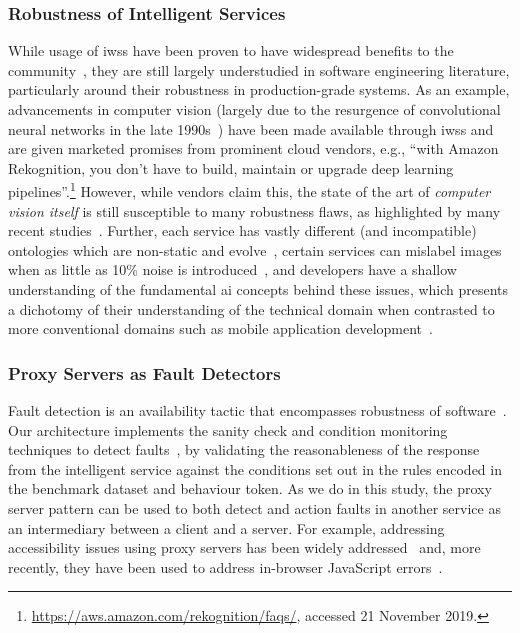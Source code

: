 \subsubsection{Robustness of Intelligent Services}
While usage of \glspl{iws} have been proven to have widespread benefits to the community~\citep{Reis:2018cp,daMotaSilveira:2017vp}, they are still largely understudied in software engineering literature, particularly around their robustness in production-grade systems. As an example, advancements in computer vision (largely due to the resurgence of convolutional neural networks in the late 1990s~\citep{Lecun:1998hy}) have been made available through \glspl{iws} and are given marketed promises from prominent cloud vendors, e.g., ``with Amazon Rekognition, you don’t have to build, maintain or upgrade deep learning pipelines''.\footnote{\url{https://aws.amazon.com/rekognition/faqs/}, accessed 21 November 2019.} However, while vendors claim this, the state of the art of \textit{computer vision itself} is still susceptible to many robustness flaws, as highlighted by many recent studies~\citep{Eykholt:2018vk,Wang:2018vl,Rosenfeld:2018ut}. Further, each service has vastly different (and incompatible) ontologies which are non-static and evolve~\citep{Cummaudo:2019icsme,Ohtake:2019vi}, certain services can mislabel images when as little as 10\% noise is introduced~\citep{Hosseini:2018jr}, and developers have a shallow understanding of the fundamental \gls{ai} concepts behind these issues, which presents a dichotomy of their understanding of the technical domain when contrasted to more conventional domains such as mobile application development~\citep{Cummaudo:2020icse}.

\subsubsection{Proxy Servers as Fault Detectors}
Fault detection is an availability tactic that encompasses robustness of software~\citep{Bass:2003wi}. Our architecture implements the sanity check and condition monitoring techniques to detect faults~\citep{Bass:2003wi,Ingeno:2018}, by validating the reasonableness of the response from the intelligent service against the conditions set out in the rules encoded in the benchmark dataset and behaviour token. As we do in this study, the proxy server pattern can be used to both detect and action faults in another service as an intermediary between a client and a server. For example, addressing accessibility issues using proxy servers has been widely addressed~\citep{Zhang:2017,Takagi2000,Bigham2006,Bigham2008} and, more recently, they have been used to address in-browser JavaScript errors~\citep{Durieux2018}.

